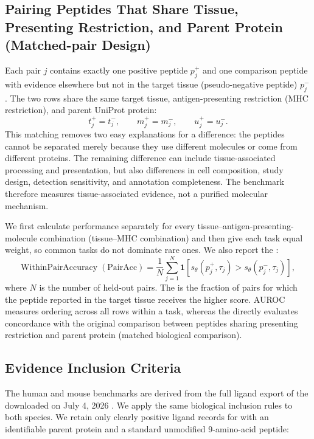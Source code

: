 \subsection{Pairing Peptides That Share Tissue, Presenting Restriction, and Parent Protein (Matched-pair Design)}

Each pair \(j\) contains exactly one positive peptide \(p_j^{+}\) and one comparison peptide with evidence elsewhere but not in the target tissue (pseudo-negative peptide) \(p_j^{-}\). The two rows share the same target tissue, antigen-presenting restriction (MHC restriction), and parent UniProt protein:
\[
t_j^{+}=t_j^{-}, \qquad
m_j^{+}=m_j^{-}, \qquad
u_j^{+}=u_j^{-}.
\]
This matching removes two easy explanations for a difference: the peptides cannot be separated merely because they use different \plainMHC{} molecules or come from different proteins. The remaining difference can include tissue-associated processing and presentation, but also differences in cell composition, study design, detection sensitivity, and annotation completeness. The benchmark therefore measures tissue-associated evidence, not a purified molecular mechanism.

We first calculate performance separately for every tissue--antigen-presenting-molecule combination (tissue--MHC combination) and then give each task equal weight, so common tasks do not dominate rare ones. We also report the \plainPairAcc{}:
\[
\mathrm{WithinPairAccuracy\;(PairAcc)}
=
\frac{1}{N}
\sum_{j=1}^{N}
\mathbf{1}
\left[
s_{\theta}(p_j^{+},\tau_j)
>
s_{\theta}(p_j^{-},\tau_j)
\right],
\]
where \(N\) is the number of held-out pairs. The \plainPairAcc{} is the fraction of pairs for which the peptide reported in the target tissue receives the higher score. AUROC measures ordering across all rows within a task, whereas the \plainPairAcc{} directly evaluates concordance with the original comparison between peptides sharing presenting restriction and parent protein (matched biological comparison).

\subsection{Evidence Inclusion Criteria}

The human and mouse benchmarks are derived from the full ligand export of the \plainIEDB{} downloaded on July 4, 2026 \cite{vita2025iedb}. We apply the same biological inclusion rules to both species. We retain only clearly positive ligand records for \plainMHCI{} with an identifiable parent protein and a standard unmodified 9-amino-acid peptide:

